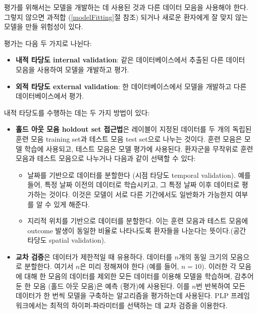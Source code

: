 \documentclass[10.5pt]{book}
\providecommand{\tightlist}{%
  \setlength{\itemsep}{0pt}\setlength{\parskip}{0pt}}
\theoremstyle{definition}
\theoremstyle{definition}
\theoremstyle{definition}
\theoremstyle{remark}
\let\BeginKnitrBlock\begin \let\EndKnitrBlock\end
\begin{document}
\BeginKnitrBlock{rmdimportant}
평가를 위해서는 모델을 개발하는 데 사용된 것과 다른 데이터 모음을
사용해야 한다. 그렇지 않으면 과적합 (\ref{modelFitting}절 참조) 되거나
새로운 환자에게 잘 맞지 않는 모델을 만들 위험성이 있다.
\EndKnitrBlock{rmdimportant}

평가는 다음 두 가지로 나뉜다:

\begin{itemize}
\tightlist
\item
  \textbf{내적 타당도 internal validation}: 같은 데이터베이스에서 추출된
  다른 데이터 모음을 사용하여 모델을 개발하고 평가.
\item
  \textbf{외적 타당도 external validation}: 한 데이터베이스에서 모델을
  개발하고 다른 데이터베이스에서 평가.
\end{itemize}

내적 타당도를 수행하는 데는 두 가지 방법이 있다:

\begin{itemize}
\tightlist
\item
  \textbf{홀드 아웃 모음 holdout set 접근법}은 레이블이 지정된 데이터를
  두 개의 독립된 훈련 모음 training set과 테스트 모음 test set으로
  나누는 것이다. 훈련 모음은 모델 학습에 사용되고, 테스트 모음은 모델
  평가에 사용된다. 환자군을 무작위로 훈련 모음과 테스트 모음으로
  나누거나 다음과 같이 선택할 수 있다:

  \begin{itemize}
  \tightlist
  \item
    날짜를 기반으로 데이터를 분할한다 (시점 타당도 temporal validation).
    예를 들어, 특정 날짜 이전의 데이터로 학습시키고, 그 특정 날짜 이후
    데이터로 평가하는 것이다. 이것은 모델이 서로 다른 기간에서도
    일반화가 가능한지 여부를 알 수 있게 해준다.
  \item
    지리적 위치를 기반으로 데이터를 분할한다. 이는 훈련 모음과 테스트
    모음에 outcome 발생이 동일한 비율로 나타나도록 환자들을 나눈다는
    뜻이다.(공간 타당도 spatial validation).
  \end{itemize}
\item
  \textbf{교차 검증}은 데이터가 제한적일 때 유용하다. 데이터를 \(n\)개의
  동일 크기의 모음으로 분할한다. 여기서 \(n\)은 미리 정해져야 한다 (예를
  들어, \(n=10\)). 이러한 각 모음에 대해 한 모음의 데이터를 제외한 모든
  데이터를 이용해 모델을 학습하며, 감추어 둔 한 모음 (홀드 아웃 모음)은
  예측 (평가)에 사용된다. 이를 \(n\)번 반복하여 모든 데이터가 한 번씩
  모델을 구축하는 알고리즘을 평가하는데 사용된다. PLP 프레임 워크에서는
  최적의 하이퍼-파라미터를 선택하는 데 교차 검증을 이용한다.
\end{itemize}
\end{document}
